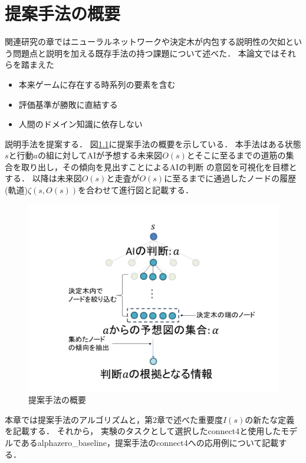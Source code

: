 \chapter{提案手法の概要}
関連研究の章ではニューラルネットワークや決定木が内包する説明性の欠如という問題点と説明を加える既存手法の持つ課題について述べた．
本論文ではそれらを踏まえた
\begin{itemize}
	\item 本来ゲームに存在する時系列の要素を含む
	\item 評価基準が勝敗に直結する
    \item 人間のドメイン知識に依存しない
\end{itemize}
説明手法を提案する．
図\ref{fig:mabs}に提案手法の概要を示している．
本手法はある状態$s$と行動$a$の組に対してAIが予想する未来図$O(s)$とそこに至るまでの道筋の集合を取り出し，その傾向を見出すことによるAIの判断
の意図を可視化を目標とする．
以降は未来図$O(s)$と走査が$O(s)$に至るまでに通過したノードの履歴(軌道)$\zeta(s, O(s))$を合わせて進行図と記載する．
\begin{figure}[t]
    \centering
    \includegraphics[width=\linewidth]{./figure/mabs.png}
    \caption{提案手法の概要}
    \label{fig:mabs}
\end{figure}
本章では提案手法のアルゴリズムと，第2章で述べた重要度$I(s)$の新たな定義を記載する．
それから，
実験のタスクとして選択したconnect4と使用したモデルであるalphazero\_baseline，提案手法のconnect4への応用例について記載する．


